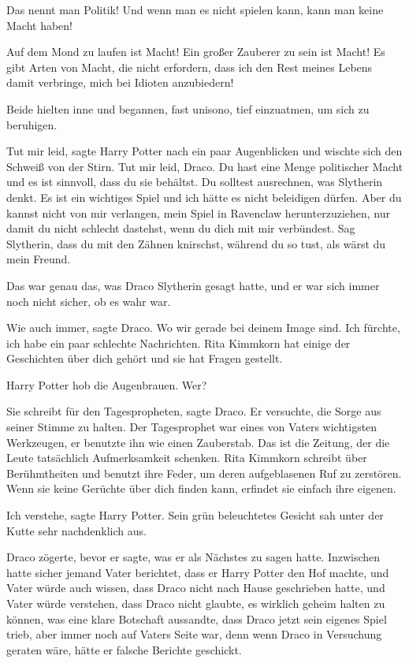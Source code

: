 \glqq Das nennt man Politik! Und wenn man es nicht spielen kann, kann man keine
Macht haben!\grqq{}

\glqq Auf dem Mond zu laufen ist Macht! Ein großer Zauberer zu sein ist Macht!
Es gibt Arten von Macht, die nicht erfordern, dass ich den Rest meines Lebens
damit verbringe, mich bei Idioten anzubiedern!\grqq{}

Beide hielten inne und begannen, fast unisono, tief einzuatmen, um sich zu
beruhigen.

\glqq Tut mir leid\grqq{}, sagte Harry Potter nach ein paar Augenblicken und
wischte sich den Schweiß von der Stirn. \glqq Tut mir leid, Draco. Du hast eine
Menge politischer Macht und es ist sinnvoll, dass du sie behältst. Du solltest
ausrechnen, was Slytherin denkt. Es ist ein wichtiges Spiel und ich hätte es
nicht beleidigen dürfen. Aber du kannst nicht von mir verlangen, mein Spiel in
Ravenclaw herunterzuziehen, nur damit du nicht schlecht dastehst, wenn du dich
mit mir verbündest. Sag Slytherin, dass du mit den Zähnen knirschst, während du
so tust, als wärst du mein Freund.\grqq{}

Das war genau das, was Draco Slytherin gesagt hatte, und er war sich immer noch
nicht sicher, ob es wahr war.

\glqq Wie auch immer\grqq{}, sagte Draco. \glqq Wo wir gerade bei deinem Image
sind. Ich fürchte, ich habe ein paar schlechte Nachrichten. Rita Kimmkorn hat
einige der Geschichten über dich gehört und sie hat Fragen gestellt.\grqq{}

Harry Potter hob die Augenbrauen. \glqq Wer?\grqq{}

\glqq Sie schreibt für den Tagespropheten\grqq{}, sagte Draco. Er versuchte, die
Sorge aus seiner Stimme zu halten. Der Tagesprophet war eines von Vaters
wichtigsten Werkzeugen, er benutzte ihn wie einen Zauberstab. \glqq Das ist die
Zeitung, der die Leute tatsächlich Aufmerksamkeit schenken. Rita Kimmkorn
schreibt über Berühmtheiten und benutzt ihre Feder, um deren aufgeblasenen Ruf
zu zerstören. Wenn sie keine Gerüchte über dich finden kann, erfindet sie
einfach ihre eigenen.\grqq{}

\glqq Ich verstehe\grqq{}, sagte Harry Potter. Sein grün beleuchtetes Gesicht
sah unter der Kutte sehr nachdenklich aus.

Draco zögerte, bevor er sagte, was er als Nächstes zu sagen hatte. Inzwischen
hatte sicher jemand Vater berichtet, dass er Harry Potter den Hof machte, und
Vater würde auch wissen, dass Draco nicht nach Hause geschrieben hatte, und
Vater würde verstehen, dass Draco nicht glaubte, es wirklich geheim halten zu
können, was eine klare Botschaft aussandte, dass Draco jetzt sein eigenes Spiel
trieb, aber immer noch auf Vaters Seite war, denn wenn Draco in Versuchung
geraten wäre, hätte er falsche Berichte geschickt.

